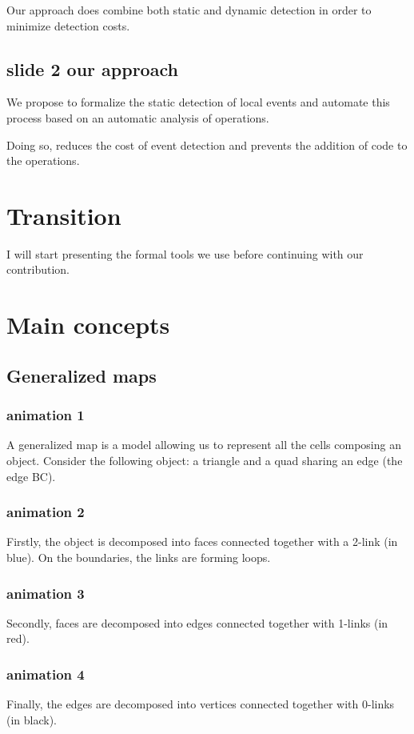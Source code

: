 \documentclass[11pt]{article}
\begin{document}
Our approach does combine both static and dynamic detection in order to minimize
detection costs.

\subsection{slide 2 our approach}
\label{sec:orgd28b7e2}
We propose to formalize the static detection of local events and automate this
process based on an automatic analysis of operations.

Doing so, reduces the cost of event detection and prevents the addition of code
to the operations.

\section{Transition}
\label{sec:orgd087b5f}

I will start presenting the formal tools we use before continuing with our
contribution.

\section{Main concepts}
\label{sec:orge59ea8b}
\subsection{Generalized maps}
\label{sec:orgdbf4802}

\subsubsection{animation 1}
\label{sec:org798e0b0}
A generalized map is a model allowing us to represent all the cells composing an
object. Consider the following object: a triangle and a quad sharing an edge
(the edge BC).
\subsubsection{animation 2}
\label{sec:org0e594a1}
Firstly, the object is decomposed into faces connected together with a 2-link
(in blue). On the boundaries, the links are forming loops.
\subsubsection{animation 3}
\label{sec:org7517240}
Secondly, faces are decomposed into edges connected together with 1-links (in
red).
\subsubsection{animation 4}
\label{sec:org08d1bb5}
Finally, the edges are decomposed into vertices connected together with 0-links
(in black).
\end{document}
